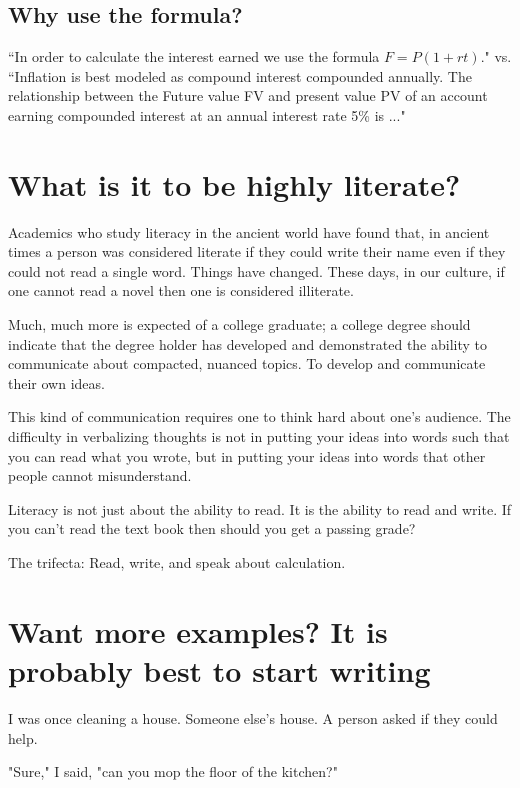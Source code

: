 \documentclass[12pt]{article}
\begin{document}
\subsection{Why use the formula?}
``In order to calculate the interest earned we use the formula $F=P(1+rt)$."
vs.\\
``Inflation is best modeled as compound interest compounded annually. The relationship between the Future value FV and present value PV of an account earning compounded interest at an annual interest rate  5\% is ..." 

\section*{What is it to be highly literate?}
Academics who study literacy in the ancient world have found that, in ancient times a person was considered literate if they could write their name even if they could not read a single word. Things have changed. These days, in our culture, if one cannot read a novel then one is considered illiterate. 

Much, much more is expected of a college graduate;  a college degree should indicate that the degree holder has developed and demonstrated the ability to communicate about compacted, nuanced topics. To develop and communicate their own ideas. 

This kind of communication requires one to think hard about one's audience. The difficulty in verbalizing thoughts is not in putting your ideas into words such that you can read what you wrote, but in putting your ideas into words that other people cannot misunderstand. 

Literacy is not just about the ability to read. It is the ability to read and write. If you can't read the text book then should you get a passing grade? 


The trifecta: Read, write, and speak about calculation.


\section{Want more examples? It is probably best to start writing}
I was once cleaning a house. Someone else's house. A person asked if they could help. 

"Sure," I said, "can you mop the floor of the kitchen?" 
\end{document}
